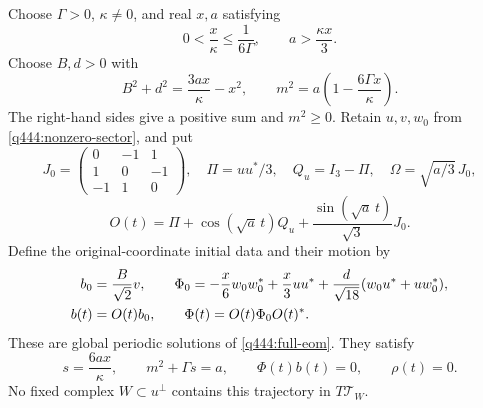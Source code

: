 \begin{theorem}\label{q444:moving-family}
Choose $\Gamma>0$, $\kappa\ne0$, and real $x,a$ satisfying
\[
 0<\frac{x}{\kappa}\leq\frac1{6\Gamma},\qquad
 a>\frac{\kappa x}{3}.
\]
Choose $B,d>0$ with
\begin{equation}\label{q444:moving-parameters}
 B^2+d^2=\frac{3ax}{\kappa}-x^2,
 \qquad m^2=a\left(1-\frac{6\Gamma x}{\kappa}\right).
\end{equation}
The right-hand sides give a positive sum and $m^2\geq0$.
Retain $u,v,w_0$ from \eqref{q444:nonzero-sector}, and put
\[
 J_0=\begin{pmatrix}0&-1&1\\1&0&-1\\-1&1&0\end{pmatrix},
 \quad \Pi=uu^*/3,\quad Q_u=I_3-\Pi,\quad
 \Omega=\sqrt{a/3}\,J_0,
\]
\begin{equation}\label{q444:rotation}
 O(t)=\Pi+\cos(\sqrt a\,t)Q_u
                 +\frac{\sin(\sqrt a\,t)}{\sqrt3}J_0.
\end{equation}
Define the original-coordinate initial data and their motion by
\begin{align}\label{q444:moving-data}
 b_0&=\frac B{\sqrt2}v,\qquad
 \Phi_0=-\frac x6w_0w_0^*+\frac x3uu^*
          +\frac d{\sqrt{18}}(w_0u^*+uw_0^*),\notag\\
 b(t)&=O(t)b_0,\qquad \Phi(t)=O(t)\Phi_0O(t)^*.
\end{align}
These are global periodic solutions of \eqref{q444:full-eom}. They satisfy
\[
 s=\frac{6ax}{\kappa},\qquad m^2+\Gamma s=a,\qquad
 \Phi(t)b(t)=0,\qquad\rho(t)=0.
\]
No fixed complex $W\subset u^\perp$ contains this trajectory in
$T\mathcal T_W$.
\end{theorem}
